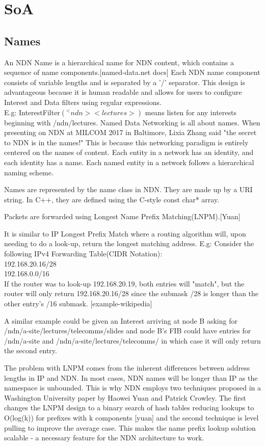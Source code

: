 \section{SoA}
\subsection{Names}
An NDN Name is a hierarchical name for NDN content, which contains a sequence of name components.[named-data.net docs] Each NDN name component  consists of variable lengths and is separated by a '/' separator. This design is advantageous because it is human readable and allows for users to configure Interest and Data filters using regular expressions. \\
E.g: InterestFilter$(^<ndn><lectures>)$ means listen for any interests beginning with /ndn/lectures. 
Named Data Networking is all about names. When presenting on NDN at MILCOM 2017 in Baltimore, Lixia Zhang said "the secret to NDN is in the names!" This is because this networking paradigm  is entirely centered on the names of content. Each entity in a network has an identity, and each identity has a name. Each named entity in a network follows a hierarchical naming scheme.\par
Names are represented by the name class in NDN. They are made up by a URI string. In C++, they are defined using the C-style const char* array. \par
Packets are forwarded using Longest Name Prefix Matching(LNPM).[Yuan] 

It is similar to IP Longest Prefix Match where a routing algorithm will, upon needing to do a look-up, return the longest matching address. E.g:
Consider the following IPv4 Forwarding Table(CIDR Notation):\\
192.168.20.16/28\\
192.168.0.0/16\\
If the router was to look-up 192.168.20.19, both entries will "match", but the router will only return 192.168.20.16/28 since the submask /28 is longer than the other entry's /16 submask. [example-wikipedia]

A similar example could be given an Interest arriving at node B asking for /ndn/a-site/lectures/telecomms/slides  and node B's FIB could have entries for /ndn/a-site and /ndn/a-site/lectures/telecomms/ in which case it will only return the second entry. \par 

The problem with LNPM comes from the inherent differences between address lengths in IP and NDN. In most cases, NDN names will be longer than IP as the namespace is unbounded. This is why NDN employs two techniques proposed in a Washington University paper by Haowei Yuan and Patrick Crowley. The first changes the LNPM design to a binary search of hash tables reducing lookups to O(log(k)) for prefixes with k components [yuan] and the second technique is level pulling to improve the average case. This makes the name prefix lookup solution scalable - a necessary feature for the NDN architecture to work. 


